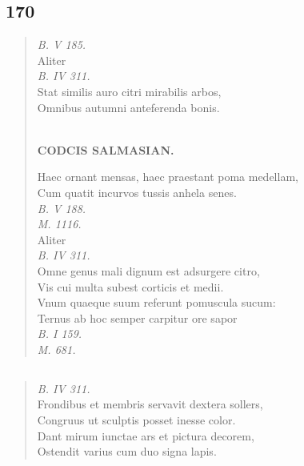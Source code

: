 \documentclass[11pt, a4paper]{report}
\begin{document}
            \subsection*{170}
      \begin{verse}
      \textit{B. V 185.} \\ Aliter \\ \textit{B. IV 311.} \\ Stat similis auro citri mirabilis arbos, \\ Omnibus autumni anteferenda bonis. \\ 
        ﻿\pagebreak 
    \begin{center} \textbf{CODCIS SALMASIAN.} \end{center} \marginpar{[151]} Haec ornant mensas, haec praestant poma medellam, \\ Cum quatit incurvos tussis anhela senes. \\ \textit{B. V 188.} \\ \textit{M. 1116.} \\ Aliter \\ \textit{B. IV 311.} \\ Omne genus mali dignum est adsurgere citro, \\ Vis cui multa subest corticis et medii. \\ Vnum quaeque suum referunt pomuscula sucum: \\ Ternus ab hoc semper carpitur ore sapor \\ \textit{B. I 159.} \\ \textit{M. 681.} \\ 
      \end{verse}
  
            \subsection*{}
      \begin{verse}
      \textit{B. IV 311.} \\ Frondibus et membris servavit dextera sollers, \\ Congruus ut sculptis posset inesse color. \\ Dant mirum iunctae ars et pictura decorem, \\ Ostendit varius cum duo signa lapis. \\ 
      \end{verse}
  
\end{document}
